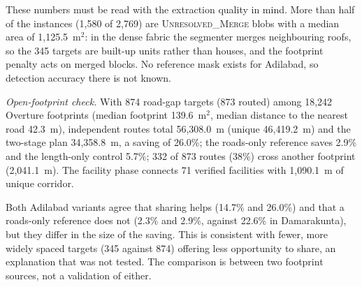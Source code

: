 \documentclass[12pt,a4paper]{article}
\begin{document}
These numbers must be read with the extraction quality in mind. More than half of the instances (1{,}580 of 2{,}769) are \textsc{Unresolved\_Merge} blobs with a median area of 1{,}125.5~m$^2$: in the dense fabric the segmenter merges neighbouring roofs, so the 345 targets are built-up units rather than houses, and the footprint penalty acts on merged blocks. No reference mask exists for Adilabad, so detection accuracy there is not known.

\emph{Open-footprint check.} With 874 road-gap targets (873 routed) among 18{,}242 Overture footprints (median footprint 139.6~m$^2$, median distance to the nearest road 42.3~m), independent routes total 56{,}308.0~m (unique 46{,}419.2~m) and the two-stage plan 34{,}358.8~m, a saving of 26.0\%; the roads-only reference saves 2.9\% and the length-only control 5.7\%; 332 of 873 routes (38\%) cross another footprint (2{,}041.1~m). The facility phase connects 71 verified facilities with 1{,}090.1~m of unique corridor.

Both Adilabad variants agree that sharing helps (14.7\% and 26.0\%) and that a roads-only reference does not (2.3\% and 2.9\%, against 22.6\% in Damarakunta), but they differ in the size of the saving. This is consistent with fewer, more widely spaced targets (345 against 874) offering less opportunity to share, an explanation that was not tested. The comparison is between two footprint sources, not a validation of either.
\end{document}

